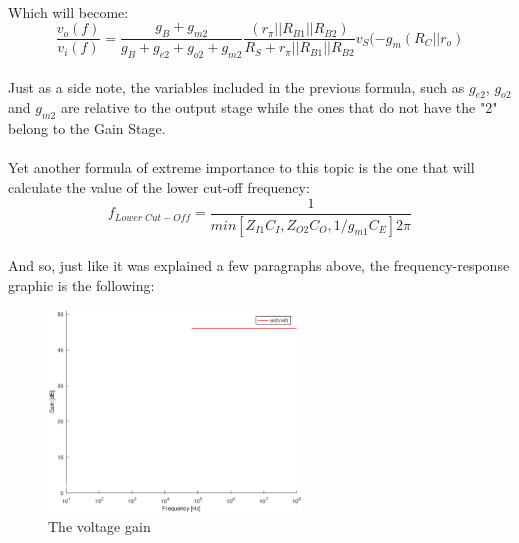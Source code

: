 \paragraph{}Which will become:
\begin{equation}
	\frac{v_o(f)}{v_i(f)}=\frac{g_B+g_{m2}}{g_B+g_{e2}+g_{o2}+g_{m2}}\frac{(r_\pi||R_{B1}||R_{B2})}{R_S+r_\pi||R_{B1}||R_{B2}}v_S(-g_m(R_C||r_o)
\end{equation}



\paragraph{} Just as a side note, the variables included in the previous formula, such as $g_{e2}$, $g_{o2}$ and $g_{m2}$ are relative to the output stage while the ones that do not have the "2" belong to the Gain Stage.
\paragraph{}Yet another formula of extreme importance to this topic is the one that will calculate the value of the lower cut-off frequency:
\begin{equation}
	f_{Lower \; Cut-Off}=\frac{1}{min[Z_{I1}C_I,Z_{O2}C_O,1/g_{m1}C_E] 2 \pi}
\end{equation} 

\paragraph{}And so, just like it was explained a few paragraphs above, the frequency-response graphic is the following:

\begin{figure}[H] \centering
	\includegraphics[width=0.6\textwidth]{gain.eps}
	\caption{The voltage gain}
	\label{fig:voltage_gain}
\end{figure}

